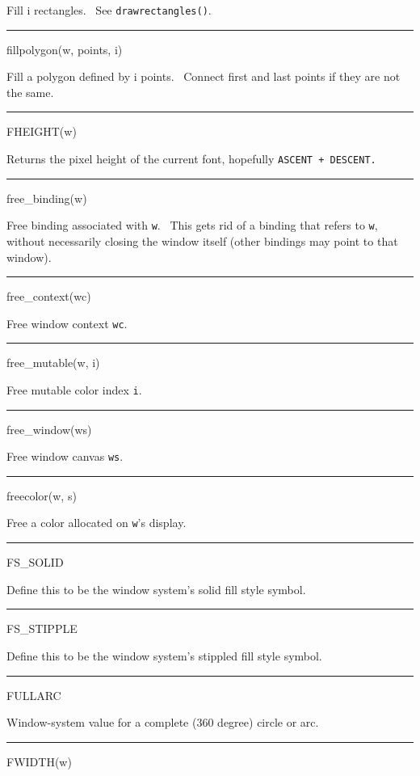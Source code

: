 Fill i rectangles. \ See \texttt{drawrectangles()}.


\bigskip\hrule\vspace{0.1cm}
\noindent
fillpolygon(w, points, i)


Fill a polygon defined by i points. \ Connect first and last points if they are not the same.


\bigskip\hrule\vspace{0.1cm}
\noindent
FHEIGHT(w)


Returns the pixel height of the current font, hopefully \texttt{ASCENT + DESCENT.}


\bigskip\hrule\vspace{0.1cm}
\noindent
free\_binding(w)


Free binding associated with \texttt{w}. \ This gets rid of a binding that refers to \texttt{w}, without necessarily
closing the window itself (other bindings may point to that window).


\bigskip\hrule\vspace{0.1cm}
\noindent
free\_context(wc)


Free window context \texttt{wc}.


\bigskip\hrule\vspace{0.1cm}
\noindent
free\_mutable(w, i)


Free mutable color index \texttt{i}.


\bigskip\hrule\vspace{0.1cm}
\noindent
free\_window(ws)


Free window canvas \texttt{ws}.


\bigskip\hrule\vspace{0.1cm}
\noindent
freecolor(w, s)


Free a color allocated on \texttt{w}{}'s display.


\bigskip\hrule\vspace{0.1cm}
\noindent
FS\_SOLID


Define this to be the window system's solid fill style symbol.


\bigskip\hrule\vspace{0.1cm}
\noindent
FS\_STIPPLE


Define this to be the window system's stippled fill style symbol.


\bigskip\hrule\vspace{0.1cm}
\noindent
FULLARC


Window-system value for a complete (360 degree) circle or arc.


\bigskip\hrule\vspace{0.1cm}
\noindent
FWIDTH(w)


